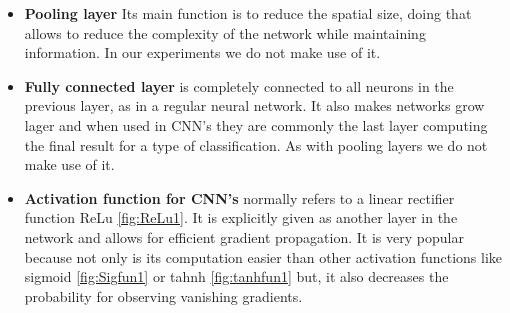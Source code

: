 \begin{itemize}
\item \textbf{Pooling layer} Its main function is to reduce the spatial size, doing that allows to reduce the complexity of the network while maintaining information. In our experiments we do not make use of it. \

\item \textbf{Fully connected layer} is completely connected to all neurons in the previous layer, as in a regular neural network. It also makes networks grow lager and when used in CNN's they are commonly the last layer computing the final result for a type of classification. As with pooling layers we do not make use of it. 

\item \textbf{Activation function for CNN's} normally refers to a linear rectifier function ReLu \ref{fig:ReLu1}. It is explicitly given as another layer in the network and allows for efficient gradient propagation. It is very popular because not only is its computation easier than other activation functions like sigmoid \ref{fig:Sigfun1} or tahnh \ref{fig:tanhfun1} but, it also decreases the probability for observing vanishing gradients.

\end{itemize}

\FloatBarrier

